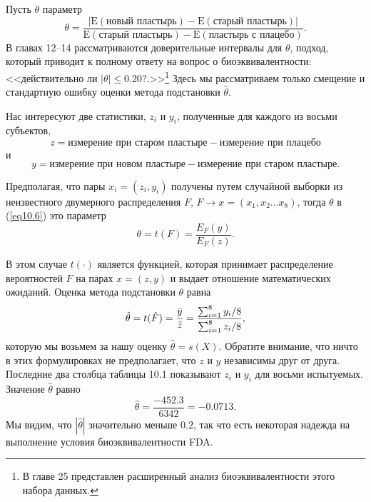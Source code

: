 Пусть $\theta$ параметр
\begin{equation}\label{eq10.6}
    \theta = \frac{\left|\mathrm{E}(\text{новый пластырь}) - \mathrm{E}(\text{старый пластырь})\right|}{\mathrm{E}(\text{старый пластырь}) - \mathrm{E}(\text{пластырь с плацебо})}.
\end{equation}
В главах 12--14 рассматриваются доверительные интервалы для $\theta$, подход, который приводит к полному ответу на вопрос о биоэквивалентности: <<действительно ли $|\theta| \leq 0.20$?.>>\footnote{В главе 25 представлен расширенный анализ биоэквивалентности этого набора данных.} Здесь мы рассматриваем только смещение и стандартную ошибку оценки метода подстановки $\hat{\theta}$.

Нас интересуют две статистики, $z_{i}$ и $y_{i}$, полученные для каждого из восьми субъектов,
\begin{equation}\label{eq10.7}
   z = \text{измерение при старом пластыре} - \text{измерение при плацебо}
\end{equation}
и
\begin{equation}\label{eq10.8}
   y = \text{измерение при новом пластыре} - \text{измерение при старом пластыре}.
\end{equation}

Предполагая, что пары $x_{i} = (z_{i}, y_{i})$ получены путем случайной выборки из неизвестного двумерного распределения $F$, $F \rightarrow x = (x_{1}, x_{2} \dots x_{8})$, тогда $\theta$ в (\ref{eq10.6}) это параметр
\begin{equation}\label{eq10.9}
   \theta = t(F) = \frac{E_{F}(y)}{E_{F}(z)}.
\end{equation}

В этом случае $t(\cdot)$ является функцией, которая принимает распределение вероятностей $F$ на парах $x = (z, y)$ и выдает отношение математических ожиданий. Оценка метода подстановки $\theta$ равна
\begin{equation}\label{eq10.10}
   \hat{\theta} = t(\hat{F}) = \frac{\Bar{y}}{\Bar{z}} = \frac{\sum_{i=1}^{8}y_{i}/8}{\sum_{i=1}^{8}z_{i}/8},
\end{equation}
которую мы возьмем за нашу оценку $\hat{\theta} = s(X)$. Обратите внимание, что ничто в этих формулировках не предполагает, что $z$ и $y$ независимы друг от друга. Последние два столбца таблицы 10.1 показывают $z_{i}$ и $y_{i}$ для восьми испытуемых. Значение $\hat{\theta}$ равно
\begin{equation}\label{eq10.11}
   \hat{\theta} = \frac{-452.3}{6342} = -0.0713.
\end{equation}
Мы видим, что $|\hat{\theta}|$ значительно меньше $0.2$, так что есть некоторая надежда на выполнение условия биоэквивалентности FDA.

